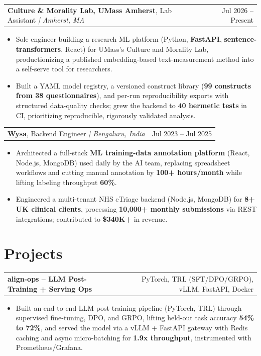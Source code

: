 \documentclass[letterpaper,11pt]{article}
\makeatletter
\newcommand{\expItem}[4]{%
  \vspace{2pt}
  \begin{tabular*}{\textwidth}{@{}l@{\extracolsep{\fill}}r@{}}
    \textbf{#1}, #2 \textit{| #3} & #4 \\
  \end{tabular*}\par\vspace{-3pt}
}
\newcommand{\projItem}[2]{%
  \vspace{2pt}
  \begin{tabular*}{\textwidth}{@{}l@{\extracolsep{\fill}}r@{}}
    \textbf{#1} & #2 \\
  \end{tabular*}\par\vspace{-3pt}
}
\makeatother
\begin{document}
\expItem{Culture \& Morality Lab, UMass Amherst}{Lab Assistant}{Amherst, MA}{Jul 2026 -- Present}
\begin{itemize}
  \item Sole engineer building a research ML platform (Python, \textbf{FastAPI}, \textbf{sentence-transformers}, React) for UMass's Culture and Morality Lab, productionizing a published embedding-based text-measurement method into a self-serve tool for researchers.
  \item Built a YAML model registry, a versioned construct library (\textbf{99 constructs from 38 questionnaires}), and per-run reproducibility exports with structured data-quality checks; grew the backend to \textbf{40 hermetic tests} in CI, prioritizing reproducible, rigorously validated analysis.
\end{itemize}

\expItem{\href{https://www.wysa.io}{Wysa}}{Backend Engineer}{Bengaluru, India}{Jul 2023 -- Jul 2025}
\begin{itemize}
  \item Architected a full-stack \textbf{ML training-data annotation platform} (React, Node.js, MongoDB) used daily by the AI team, replacing spreadsheet workflows and cutting manual annotation by \textbf{100+ hours/month} while lifting labeling throughput \textbf{60\%}.
  \item Engineered a multi-tenant NHS eTriage backend (Node.js, MongoDB) for \textbf{8+ UK clinical clients}, processing \textbf{10{,}000+ monthly submissions} via REST integrations; contributed to \textbf{\$340K+} in revenue.
\end{itemize}

\section{Projects}

\projItem{align-ops -- LLM Post-Training + Serving Ops}{PyTorch, TRL (SFT/DPO/GRPO), vLLM, FastAPI, Docker}
\begin{itemize}
  \item Built an end-to-end LLM post-training pipeline (PyTorch, TRL) through supervised fine-tuning, DPO, and GRPO, lifting held-out task accuracy \textbf{54\% to 72\%}, and served the model via a vLLM + FastAPI gateway with Redis caching and async micro-batching for \textbf{1.9x throughput}, instrumented with Prometheus/Grafana.
\end{itemize}
\end{document}
